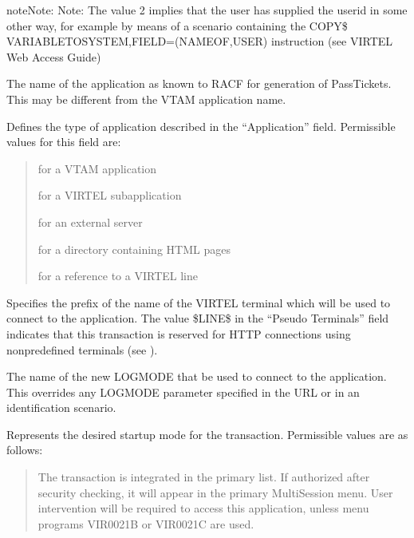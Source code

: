 \documentclass[letterpaper,10pt,english]{sphinxmanual}
\begin{document}
\begin{sphinxadmonition}{note}{Note:}
\sphinxAtStartPar
Note: The value 2 implies that the user has supplied the userid in some other way, for example by means of a scenario containing the COPY\$ VARIABLE\sphinxhyphen{}TO\sphinxhyphen{}SYSTEM,FIELD=(NAME\sphinxhyphen{}OF,USER) instruction (see VIRTEL Web Access Guide)
\end{sphinxadmonition}
\begin{description}
\sphinxAtStartPar
The name of the application as known to RACF for generation of PassTickets. This may be different from the VTAM application name.

\sphinxAtStartPar
Defines the type of application described in the “Application” field. Permissible values for this field are:
\begin{quote}
\begin{description}
\sphinxAtStartPar
for a VTAM application

\sphinxAtStartPar
for a VIRTEL sub\sphinxhyphen{}application

\sphinxAtStartPar
for an external server

\sphinxAtStartPar
for a directory containing HTML pages

\sphinxAtStartPar
for a reference to a VIRTEL line

\end{description}
\end{quote}

\sphinxAtStartPar
Specifies the prefix of the name of the VIRTEL terminal which will be used to connect to the application. The value \$LINE\$ in the “Pseudo Terminals” field indicates that this transaction is reserved for HTTP connections using non\sphinxhyphen{}predefined terminals (see {\hyperref[\detokenize{connectivity_guide:v461cn-forceluname}]{}}).

\sphinxAtStartPar
The name of the new LOGMODE that  be used to connect to the application. This overrides any LOGMODE parameter specified in the URL or in an identification scenario.

\sphinxAtStartPar
Represents the desired startup mode for the transaction. Permissible values are as follows:
\begin{quote}
\begin{description}
\sphinxAtStartPar
The transaction is integrated in the primary list. If authorized after security checking, it will appear in the primary Multi\sphinxhyphen{}Session menu. User intervention will be required to access this application, unless menu programs VIR0021B or VIR0021C are used.


\end{description}
\end{quote}
\end{description}
\end{document}
